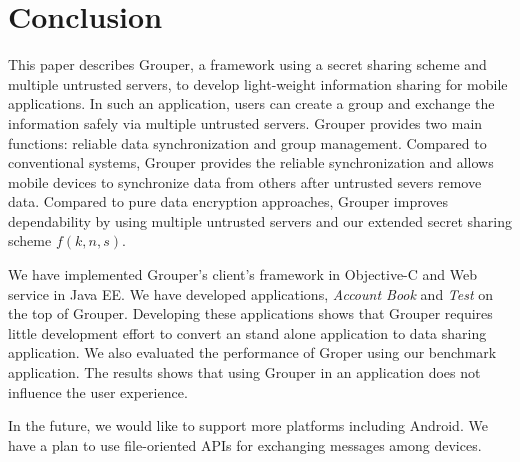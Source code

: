 \documentclass[twocolumn,10pt]{article}
\begin{document}
\section{Conclusion}

This paper describes Grouper, a framework using a secret sharing scheme and multiple untrusted servers, to develop light-weight information sharing for mobile applications.
In such an application, users can create a group and exchange the information safely via multiple untrusted servers.
Grouper provides two main functions: reliable data synchronization and group management.
Compared to conventional systems, Grouper provides the reliable synchronization and allows mobile devices to synchronize data from others after untrusted severs remove data.
Compared to pure data encryption approaches, Grouper improves dependability by using multiple untrusted servers and our extended secret sharing scheme $f(k, n, s)$.

We have implemented Grouper's client's framework in Objective-C and Web service in Java EE. 
We have developed applications, \emph{Account Book} and \emph{Test} on the top of Grouper.
Developing these applications shows that Grouper requires little development effort to convert an stand alone application to data sharing application.
We also evaluated the performance of Groper using our benchmark application.
The results shows that using Grouper in an application does not influence the user experience.

In the future, we would like to support more platforms including Android.
We have a plan to use file-oriented APIs for exchanging messages among devices.


{
	\footnotesize
	
}
\end{document}
